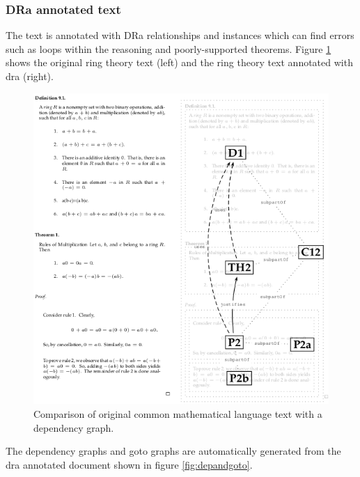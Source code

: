 \subsubsection{DRa annotated text}

The text is annotated with DRa relationships and instances which can find errors
such as loops within the reasoning and poorly-supported theorems. Figure \ref{fig:ringdra} shows
the original ring theory text (left) and the ring theory text annotated with
\gls{dra} (right).

\begin{figure}[H]
\begin{center}
\includegraphics[scale=0.75]{Figures/Background/draforrings.png}
\end{center}
\caption{Comparison of original common mathematical language text with a
dependency graph.
 \label{fig:ringdra}}
\end{figure}

The dependency graphs and goto graphs are automatically generated from the
\gls{dra} annotated document shown in figure \ref{fig:depandgoto}.

